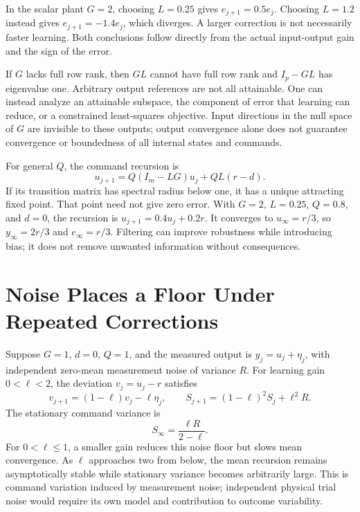 In the scalar plant $G=2$, choosing $L=0.25$ gives $e_{j+1}=0.5e_j$. Choosing $L=1.2$ instead gives $e_{j+1}=-1.4e_j$, which diverges. A larger correction is not necessarily faster learning. Both conclusions follow directly from the actual input-output gain and the sign of the error.

If $G$ lacks full row rank, then $GL$ cannot have full row rank and $I_p-GL$ has eigenvalue one. Arbitrary output references are not all attainable. One can instead analyze an attainable subspace, the component of error that learning can reduce, or a constrained least-squares objective. Input directions in the null space of $G$ are invisible to these outputs; output convergence alone does not guarantee convergence or boundedness of all internal states and commands.

For general $Q$, the command recursion is
\begin{equation}
u_{j+1}=Q(I_m-LG)u_j+QL(r-d).
\end{equation}
If its transition matrix has spectral radius below one, it has a unique attracting fixed point. That point need not give zero error. With $G=2$, $L=0.25$, $Q=0.8$, and $d=0$, the recursion is $u_{j+1}=0.4u_j+0.2r$. It converges to $u_\infty=r/3$, so $y_\infty=2r/3$ and $e_\infty=r/3$. Filtering can improve robustness while introducing bias; it does not remove unwanted information without consequences.

\section{Noise Places a Floor Under Repeated Corrections}

Suppose $G=1$, $d=0$, $Q=1$, and the measured output is $y_j=u_j+\eta_j$, with independent zero-mean measurement noise of variance $R$. For learning gain $0<\ell<2$, the deviation $v_j=u_j-r$ satisfies
\begin{equation}
v_{j+1}=(1-\ell)v_j-\ell\eta_j,\qquad
S_{j+1}=(1-\ell)^2S_j+\ell^2R .
\end{equation}
The stationary command variance is
\begin{equation}
S_\infty=\frac{\ell R}{2-\ell} .
\end{equation}
For $0<\ell\leq1$, a smaller gain reduces this noise floor but slows mean convergence. As $\ell$ approaches two from below, the mean recursion remains asymptotically stable while stationary variance becomes arbitrarily large. This is command variation induced by measurement noise; independent physical trial noise would require its own model and contribution to outcome variability.

